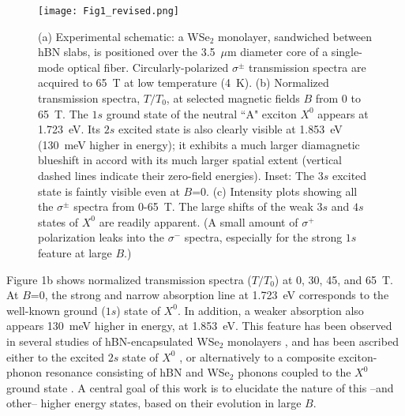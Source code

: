 \documentclass[aps,prl,twocolumn]{revtex4-1}
\begin{document}
\begin{figure}[tbp]
\center
\texttt{[image: Fig1\_revised.png]}
\caption{(a) Experimental schematic: a WSe$_2$ monolayer, sandwiched between hBN slabs, is positioned over the 3.5~$\mu$m diameter core of a single-mode optical fiber. Circularly-polarized $\sigma^\pm$ transmission spectra are acquired to 65~T at low temperature (4~K). (b) Normalized transmission spectra, $T/T_0$, at selected magnetic fields $B$ from 0 to 65~T. The $1s$ ground  state of the neutral ``A" exciton $X^0$ appears at 1.723~eV. Its $2s$ excited state is also clearly visible at 1.853~eV (130~meV higher in energy); it exhibits a much larger diamagnetic blueshift in accord with its much larger spatial extent (vertical dashed lines indicate their zero-field energies). Inset: The $3s$ excited state is faintly visible even at $B$=0. (c) Intensity plots showing all the $\sigma^\pm$ spectra from 0-65~T. The large shifts of the weak $3s$ and $4s$ states of $X^0$ are readily apparent. (A small amount of $\sigma^+$ polarization leaks into the $\sigma^-$ spectra, especially for the strong $1s$ feature at large $B$.)}
\label{fig1}
\end{figure}

Figure 1b shows normalized transmission spectra ($T/T_0$) at 0, 30, 45, and 65~T. At $B$=0, the strong and narrow absorption line at 1.723~eV corresponds to the well-known  ground ($1s$) state of $X^0$. In addition, a weaker absorption also appears 130~meV higher in energy, at 1.853~eV. This feature has been observed in several studies of hBN-encapsulated WSe$_2$ monolayers \cite{Courtade, Scharf, Manca, Chow, Jin}, and has been ascribed either to the excited $2s$ state of $X^0$ \cite{Scharf, Manca}, or alternatively to a composite exciton-phonon resonance consisting of hBN and WSe$_2$ phonons coupled to the $X^0$ ground state \cite{Jin, Chow}. A central goal of this work is to elucidate the nature of this --and other-- higher energy states, based on their evolution in large $B$. 
\end{document}
